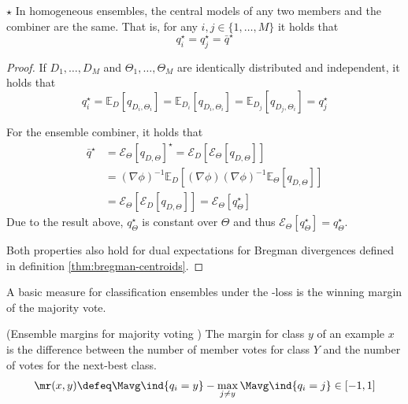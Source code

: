 \documentclass[
	twoside=false, %
]{kaobook}
\begin{document}
\begin{lemma}
 \label{thm:qstars-same} 
  $\star$ In homogeneous ensembles, the central models of any two members and the combiner are the same. That is, for any $i, j \in \{ 1, \dots, M \}$ it holds that
$$
q_{i}^\star = q_{j}^\star = \bar{q}^\star
$$
\end{lemma}
\begin{proof}
If $D_{1}, \dots, D_{M}$ and $\Theta_{1}, \dots, \Theta_{M}$ are identically distributed and independent, it holds that
$$
q_{i}^\star = \mathbb{E}_{D}\left[ q_{D_{i}, \Theta_{i}} \right]  = \mathbb{E}_{D_{i}}\left[ q_{D_{i}, \Theta_{i}} \right]  
= \mathbb{E}_{D_{j}}\left[ q_{D_{j}, \Theta_{i}} \right] = q_{j}^\star
$$

For the ensemble combiner, it holds that
\begin{align*}
\bar{q}^\star &= \mathcal{E}_{\Theta}\left[ q_{D,\Theta} \right] ^\star = \mathcal{E}_{D}\left[ \mathcal{E}_{\Theta}\left[ q_{D,\Theta} \right]   \right] \\
&= (\nabla \phi)^{-1} \mathbb{E}_{D}\left[ (\nabla \phi) (\nabla \phi)^{-1} \mathbb{E}_{\Theta}\left[ q_{D,\Theta} \right]   \right] \\
&= \mathcal{E}_{\Theta}\left[ \mathcal{E}_{D}\left[ q_{D, \Theta} \right]  \right] = \mathcal{E}_{\Theta}\left[ q_{\Theta}^\star \right] 
\end{align*}
Due to the result above, $q_{\Theta}^\star$ is constant over $\Theta$ and thus $\mathcal{E}_{\Theta}\left[ q_{\Theta}^\star \right] = q_{\Theta}^\star$.

Both properties also hold for dual expectations for Bregman divergences defined in definition \ref{thm:bregman-centroids}.
\end{proof}

A basic measure for classification ensembles under the \zeroone-loss is the winning margin of the majority vote.
\begin{definition} (Ensemble margins for majority voting \cite{breiman_RandomForests_2001})
The margin for class $y$ of an example $x$ is the difference between the number of member votes for class $Y$ and the number of votes for the next-best class.
	$$
\mr(x,y) \defeq \Mavg \ind{q_{i} = y} - \max_{j \neq y} \Mavg \ind{q_{i} = j} \in [-1, 1]
$$
\label{def:ensemble-margin}
\end{definition}
\end{document}
